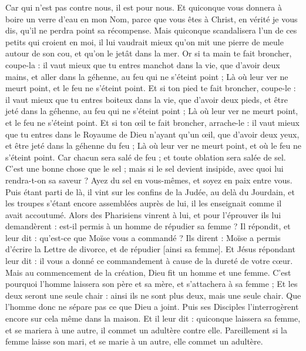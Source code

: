 \begin{multicols}{2}
Car qui n'est pas contre nous, il est pour nous.
Et quiconque vous donnera à boire un verre d'eau en mon Nom, parce que vous êtes à Christ, en vérité je vous dis, qu'il ne perdra point sa récompense.
Mais quiconque scandalisera l'un de ces petits qui croient en moi, il lui vaudrait mieux qu'on mit une pierre de meule autour de son cou, et qu'on le jetât dans la mer.
Or si ta main te fait broncher, coupe-la : il vaut mieux que tu entres manchot dans la vie, que d'avoir deux mains, et aller dans la géhenne, au feu qui ne s'éteint point ;
Là où leur ver ne meurt point, et le feu ne s'éteint point.
Et si ton pied te fait broncher, coupe-le : il vaut mieux que tu entres boiteux dans la vie, que d'avoir deux pieds, et être jeté dans la géhenne, au feu qui ne s'éteint point ;
Là où leur ver ne meurt point, et le feu ne s'éteint point.
Et si ton œil te fait broncher, arrache-le : il vaut mieux que tu entres dans le Royaume de Dieu n'ayant qu'un œil, que d'avoir deux yeux, et être jeté dans la géhenne du feu ;
Là où leur ver ne meurt point, et où le feu ne s'éteint point.
Car chacun sera salé de feu ; et toute oblation sera salée de sel.
C'est une bonne chose que le sel ; mais si le sel devient insipide, avec quoi lui rendra-t-on sa saveur ?
Ayez du sel en vous-mêmes, et soyez en paix entre vous.
\VerseOne{}Puis étant parti de là, il vint sur les confins de la Judée, au delà du Jourdain, et les troupes s'étant encore assemblées auprès de lui, il les enseignait comme il avait accoutumé.
Alors des Pharisiens vinrent à lui, et pour l'éprouver ils lui demandèrent : est-il permis à un homme de répudier sa femme ?
Il répondit, et leur dit : qu'est-ce que Moïse vous a commandé ?
Ils dirent : Moïse a permis d'écrire la Lettre de divorce, et de répudier [ainsi sa femme].
Et Jésus répondant leur dit : il vous a donné ce commandement à cause de la dureté de votre cœur.
Mais au commencement de la création, Dieu fit un homme et une femme.
C'est pourquoi l'homme laissera son père et sa mère, et s'attachera à sa femme ;
Et les deux seront une seule chair : ainsi ils ne sont plus deux, mais une seule chair.
Que l'homme donc ne sépare pas ce que Dieu a joint.
Puis ses Disciples l'interrogèrent encore sur cela même dans la maison.
Et il leur dit : quiconque laissera sa femme, et se mariera à une autre, il commet un adultère contre elle.
Pareillement si la femme laisse son mari, et se marie à un autre, elle commet un adultère.

\end{multicols}
